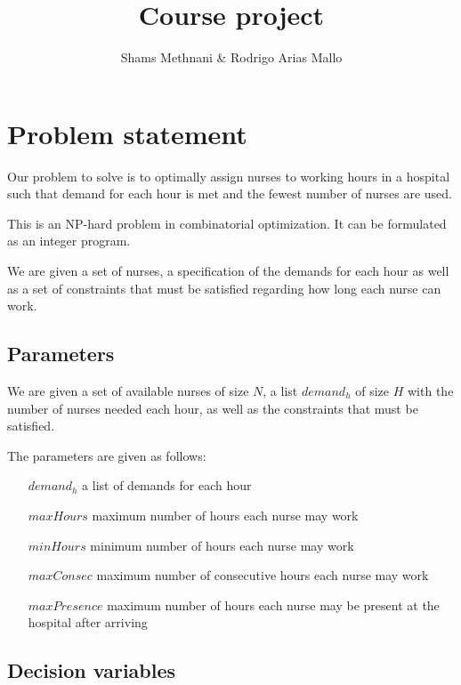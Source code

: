 \documentclass[12pt,a4paper]{article}
\title{Course project}
\author{Shams Methnani \& Rodrigo Arias Mallo}
\begin{document}
\maketitle

\section{Problem statement}


Our problem to solve is to optimally assign nurses to working hours in a hospital such that demand for each hour is met and the fewest number of nurses are used.

This is an NP-hard problem in combinatorial optimization. It can be formulated as an integer program.

We are given a set of nurses, a specification of the demands for each hour as well as a set of constraints that must be satisfied regarding how long each nurse can work.

\subsection{Parameters}

We are given a set of available nurses of size $N$, a list ${demand}_h$ of size $H$ with the number of nurses needed each hour, as well as the constraints that must be satisfied.

The parameters are given as follows:
    \begin{enumerate}
    \paragraph{}
        \item [${demand}_h$] a list of demands for each hour
        \item [${maxHours}$] maximum number of hours each nurse may work
        \item [${minHours}$] minimum number of hours each nurse may work
        \item [${maxConsec}$] maximum number of consecutive hours each nurse may work
        \item [${maxPresence}$] maximum number of hours each nurse may be present at the hospital after arriving
    \end{enumerate}
%
\subsection{Decision variables}
\end{document}
